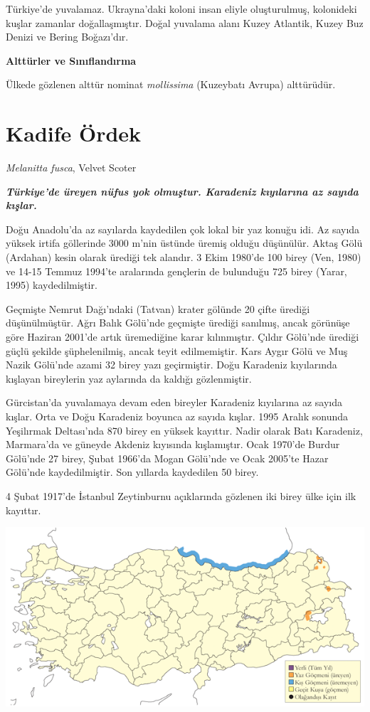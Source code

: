 \documentclass[
  a4paper,
  DIV=11,
  numbers=noendperiod]{scrreprt}
\begin{document}
Türkiye'de yuvalamaz. Ukrayna'daki koloni insan eliyle oluşturulmuş,
kolonideki kuşlar zamanlar doğallaşmıştır. Doğal yuvalama alanı Kuzey
Atlantik, Kuzey Buz Denizi ve Bering Boğazı'dır.

\textbf{Alttürler ve Sınıflandırma}

Ülkede gözlenen alttür nominat \emph{mollissima} (Kuzeybatı Avrupa)
alttürüdür.

\section{Kadife Ördek}\label{kadife-uxf6rdek}

\emph{Melanitta fusca}, Velvet Scoter

\textbf{\emph{Türkiye'de üreyen nüfus yok olmuştur. Karadeniz kıyılarına
az sayıda kışlar.}}

Doğu Anadolu'da az sayılarda kaydedilen çok lokal bir yaz konuğu idi. Az
sayıda yüksek irtifa göllerinde 3000 m'nin üstünde üremiş olduğu
düşünülür. Aktaş Gölü (Ardahan) kesin olarak ürediği tek alandır. 3 Ekim
1980'de 100 birey (Ven, 1980) ve 14-15 Temmuz 1994'te aralarında
gençlerin de bulunduğu 725 birey (Yarar, 1995) kaydedilmiştir.

Geçmişte Nemrut Dağı'ndaki (Tatvan) krater gölünde 20 çifte ürediği
düşünülmüştür. Ağrı Balık Gölü'nde geçmişte ürediği sanılmış, ancak
görünüşe göre Haziran 2001'de artık üremediğine karar kılınmıştır.
Çıldır Gölü'nde ürediği güçlü şekilde şüphelenilmiş, ancak teyit
edilmemiştir. Kars Aygır Gölü ve Muş Nazik Gölü'nde azami 32 birey yazı
geçirmiştir. Doğu Karadeniz kıyılarında kışlayan bireylerin yaz
aylarında da kaldığı gözlenmiştir.

Gürcistan'da yuvalamaya devam eden bireyler Karadeniz kıyılarına az
sayıda kışlar. Orta ve Doğu Karadeniz boyunca az sayıda kışlar. 1995
Aralık sonunda Yeşilırmak Deltası'nda 870 birey en yüksek kayıttır.
Nadir olarak Batı Karadeniz, Marmara'da ve güneyde Akdeniz kıyısında
kışlamıştır. Ocak 1970'de Burdur Gölü'nde 27 birey, Şubat 1966'da Mogan
Gölü'nde ve Ocak 2005'te Hazar Gölü'nde kaydedilmiştir. Son yıllarda
kaydedilen 50 birey.

4 Şubat 1917'de İstanbul Zeytinburnu açıklarında gözlenen iki birey ülke
için ilk kayıttır.

\includegraphics{images/harita_Page_028.png}
\end{document}
